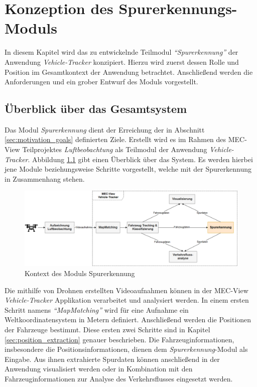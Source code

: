 
\chapter{Konzeption des Spurerkennungs-Moduls}
\label{cha:konzeption}

In diesem Kapitel wird das zu entwickelnde Teilmodul \textit{``Spurerkennung''}
der Anwendung \textit{Vehicle-Tracker} konzipiert. Hierzu wird zuerst dessen Rolle und Position im Gesamtkontext
der Anwendung betrachtet. Anschließend werden die Anforderungen und ein grober Entwurf des Moduls vorgestellt.

\section{Überblick über das Gesamtsystem}

Das Modul \textit{Spurerkennung} dient der Erreichung der in Abschnitt
\ref{sec:motivation_goals} definierten Ziele. Erstellt wird es im Rahmen des MEC-View Teilprojektes
\textit{Luftbeobachtung} als Teilmodul der Anwendung \textit{Vehicle-Tracker}.
Abbildung \ref{fig:concept_laneDetection_context} gibt einen Überblick über das System.
Es werden hierbei jene Module beziehungsweise Schritte vorgestellt, welche mit der Spurerkennung in
Zusammenhang stehen.

\begin{figure}[H]
    \centering
    \includegraphics[width=\linewidth]{resources/img/konzeption/Context_LaneDetection}
    \caption{Kontext des Moduls Spurerkennung}
    \label{fig:concept_laneDetection_context}
\end{figure}

Die mithilfe von Drohnen erstellten Videoaufnahmen können in der MEC-View \textit{Vehicle-Tracker} Applikation
verarbeitet und analysiert werden. In einem ersten Schritt namens \textit{``MapMatching''} wird für eine Aufnahme
ein Weltkoordinatensystem in Metern definiert. Anschließend werden die Positionen
der Fahrzeuge bestimmt. Diese ersten zwei Schritte sind in Kapitel \ref{sec:position_extraction} genauer beschrieben.
Die Fahrzeuginformationen, insbesondere die Positionsinformationen, dienen dem \textit{Spurerkennung}-Modul
als Eingabe. Aus ihnen extrahierte Spurdaten können anschließend in der Anwendung visualisiert werden oder in Kombination
mit den Fahrzeuginformationen zur Analyse des Verkehrsflusses eingesetzt werden.

